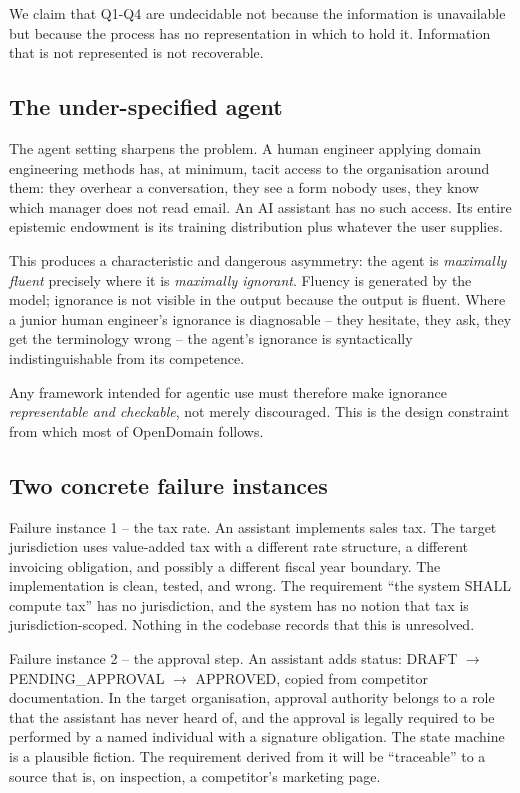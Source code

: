 \documentclass[11pt,a4paper]{article}
\begin{document}
We claim that Q1-Q4 are undecidable not because the information is unavailable but because the process has no representation in which to hold it. Information that is not represented is not recoverable.

\subsection{The under-specified agent}

The agent setting sharpens the problem. A human engineer applying domain engineering methods has, at minimum, tacit access to the organisation around them: they overhear a conversation, they see a form nobody uses, they know which manager does not read email. An AI assistant has no such access. Its entire epistemic endowment is its training distribution plus whatever the user supplies.

This produces a characteristic and dangerous asymmetry: the agent is \emph{maximally fluent} precisely where it is \emph{maximally ignorant}. Fluency is generated by the model; ignorance is not visible in the output because the output is fluent. Where a junior human engineer's ignorance is diagnosable -- they hesitate, they ask, they get the terminology wrong -- the agent's ignorance is syntactically indistinguishable from its competence.

Any framework intended for agentic use must therefore make ignorance \emph{representable and checkable}, not merely discouraged. This is the design constraint from which most of OpenDomain follows.

\subsection{Two concrete failure instances}

Failure instance 1 -- the tax rate. An assistant implements sales tax. The target jurisdiction uses value-added tax with a different rate structure, a different invoicing obligation, and possibly a different fiscal year boundary. The implementation is clean, tested, and wrong. The requirement ``the system SHALL compute tax'' has no jurisdiction, and the system has no notion that tax is jurisdiction-scoped. Nothing in the codebase records that this is unresolved.

Failure instance 2 -- the approval step. An assistant adds status: DRAFT $\rightarrow$ PENDING\_APPROVAL $\rightarrow$ APPROVED, copied from competitor documentation. In the target organisation, approval authority belongs to a role that the assistant has never heard of, and the approval is legally required to be performed by a named individual with a signature obligation. The state machine is a plausible fiction. The requirement derived from it will be ``traceable'' to a source that is, on inspection, a competitor's marketing page.
\end{document}
